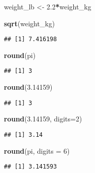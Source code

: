 \documentclass[]{article}
\newenvironment{Shaded}{\begin{snugshade}}{\end{snugshade}}
\newcommand{\KeywordTok}[1]{\textcolor[rgb]{0.13,0.29,0.53}{\textbf{#1}}}
\newcommand{\DataTypeTok}[1]{\textcolor[rgb]{0.13,0.29,0.53}{#1}}
\newcommand{\DecValTok}[1]{\textcolor[rgb]{0.00,0.00,0.81}{#1}}
\newcommand{\FloatTok}[1]{\textcolor[rgb]{0.00,0.00,0.81}{#1}}
\newcommand{\StringTok}[1]{\textcolor[rgb]{0.31,0.60,0.02}{#1}}
\newcommand{\OperatorTok}[1]{\textcolor[rgb]{0.81,0.36,0.00}{\textbf{#1}}}
\newcommand{\NormalTok}[1]{#1}
\begin{document}
\begin{Shaded}
\begin{Highlighting}[]
\NormalTok{weight_lb <-}\StringTok{ }\FloatTok{2.2}\OperatorTok{*}\NormalTok{weight_kg}

\KeywordTok{sqrt}\NormalTok{(weight_kg)}
\end{Highlighting}
\end{Shaded}

\begin{verbatim}
## [1] 7.416198
\end{verbatim}

\begin{Shaded}
\begin{Highlighting}[]
\KeywordTok{round}\NormalTok{(pi)}
\end{Highlighting}
\end{Shaded}

\begin{verbatim}
## [1] 3
\end{verbatim}

\begin{Shaded}
\begin{Highlighting}[]
\KeywordTok{round}\NormalTok{(}\FloatTok{3.14159}\NormalTok{)}
\end{Highlighting}
\end{Shaded}

\begin{verbatim}
## [1] 3
\end{verbatim}

\begin{Shaded}
\begin{Highlighting}[]
\KeywordTok{round}\NormalTok{(}\FloatTok{3.14159}\NormalTok{, }\DataTypeTok{digits=}\DecValTok{2}\NormalTok{)}
\end{Highlighting}
\end{Shaded}

\begin{verbatim}
## [1] 3.14
\end{verbatim}

\begin{Shaded}
\begin{Highlighting}[]
\KeywordTok{round}\NormalTok{(pi, }\DataTypeTok{digits =} \DecValTok{6}\NormalTok{)}
\end{Highlighting}
\end{Shaded}

\begin{verbatim}
## [1] 3.141593
\end{verbatim}
\end{document}
